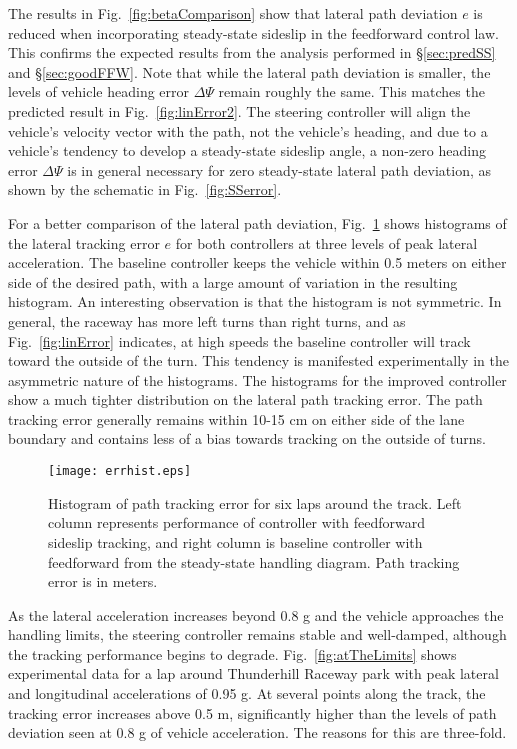 The results in Fig.~\ref{fig:betaComparison} show that lateral path deviation $e$ is reduced when incorporating 
steady-state sideslip in the feedforward control law. This confirms the expected results from the analysis performed in \S \ref{sec:predSS}
and \S \ref{sec:goodFFW}. Note that while the lateral path deviation is smaller, the levels of vehicle heading error $\Delta\Psi$ remain roughly the
same. This matches the predicted result in Fig.~\ref{fig:linError2}. The steering controller will align the vehicle's
velocity vector with the path, not the vehicle's heading, and due to a vehicle's tendency to develop a steady-state sideslip angle,
 a non-zero heading error $\Delta\Psi$ is in general necessary for zero steady-state lateral path deviation,
 as shown by the schematic in Fig.~\ref{fig:SSerror}.

 For a better comparison of the lateral path deviation, Fig.~\ref{fig:errhist} shows histograms of the lateral tracking
error $e$ for both controllers at three levels of peak lateral acceleration. The baseline controller keeps the vehicle within 0.5 meters
 on either side of the desired path, with a large
amount of variation in the resulting histogram. An interesting observation is that the 
histogram is not symmetric. In general, the raceway has more left turns than right turns, and as Fig.~\ref{fig:linError} indicates, at
high speeds the baseline controller will track toward the outside of the turn. This tendency is manifested experimentally in the asymmetric nature
of the histograms. The histograms for the improved controller show a much tighter distribution on the lateral path tracking 
error. The path tracking error generally remains within 10-15 cm on either side of the lane boundary and contains less of a bias towards tracking
on the outside of turns.  
 
\begin{figure}
\centering
\texttt{[image: errhist.eps]}
\caption[Histogram of path tracking error for six laps around the track.]{Histogram of path tracking error for six laps around the track. Left column represents performance of controller
with feedforward sideslip tracking, and right column is baseline controller with feedforward from
the steady-state handling diagram. Path tracking error is in meters.}
\label{fig:errhist}
\end{figure}

As the lateral acceleration increases beyond 0.8 g and the vehicle approaches the handling limits, the steering controller
remains stable and well-damped, although the tracking performance begins to degrade. Fig.~\ref{fig:atTheLimits} shows experimental
data for a lap around Thunderhill Raceway park with peak lateral and longitudinal accelerations of 0.95 g. At several points along the
track, the tracking error increases above 0.5 m, significantly higher than the levels of path deviation seen at 0.8 g of vehicle acceleration.
The reasons for this are three-fold. 

